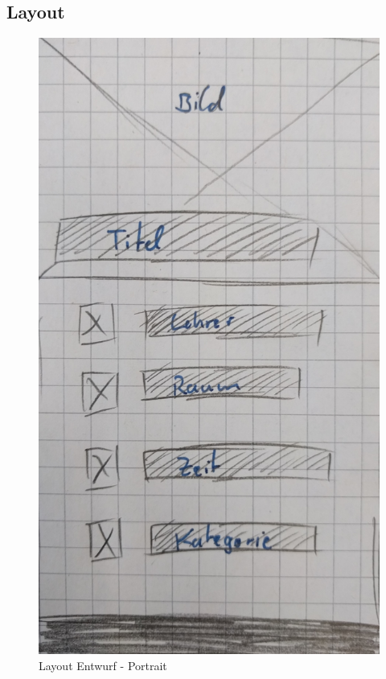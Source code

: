 \documentclass[11pt, oneside]{article}
\begin{document}
\subsection{Layout}
\begin{figure}[h]
	\begin{center}
	\includegraphics[scale=0.1]{sketch_1}
	\end{center}
	\caption{Layout Entwurf - Portrait}
	\label{fig:sketch1}
\end{figure}
\end{document}
